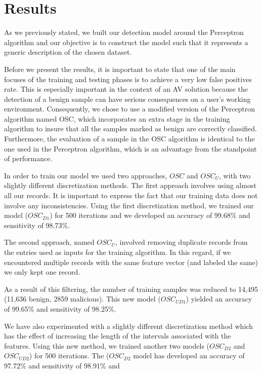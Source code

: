 \section{Results}
\par
As we previously stated, we built our detection model around the Perceptron algorithm and our objective is to construct the model such that it represents a generic description of the chosen dataset.
\par
Before we present the results, it is important to state that one of the main focuses of the training and testing phases is to achieve a very low false positives rate. This is especially important in the context of an AV solution because the detection of a benign sample can have serious consequences on a user's working environment. Consequently, we chose to use a modified version of the Perceptron algorithm named OSC, which incorporates an extra stage in the training algorithm to insure that all the samples marked as benign are correctly classified. Furthermore, the evaluation of a sample in the OSC algorithm is identical to the one used in the Perceptron algorithm, which is an advantage from the standpoint of performance.
\par
In order to train our model we used two approaches, $OSC$ and $OSC_{U}$, with two slightly different discretization methods. The first approach involves using almost all our records. It is important to express the fact that our training data does not involve any inconsistencies. Using the first discretization method, we trained our model ({$OSC_{D1}$}) for 500 iterations and we developed an accuracy of 99.68\% and sensitivity of 98.73\%. 
\par
The second approach, named $OSC_{U}$,  involved removing duplicate records from the entries used as inputs for the training algorithm. In this regard, if we encountered multiple records with the same feature vector (and labeled the same) we only kept one record.
\par
As a result of this filtering, the number of training samples was reduced to 14,495 (11,636 benign, 2859 malicious). This new model ({$OSC_{UD1}$}) yielded an accuracy of 99.65\% and sensitivity of 98.25\%.
\par
We have also experimented with a slightly different discretization method which has the effect of increasing the length of the intervals associated with the features. Using this new method, we trained another two models ({$OSC_{D2}$} and {$OSC_{UD2}$}) for 500 iterations. The ({$OSC_{D2}$} model has developed an accuracy of 97.72\% and sensitivity of 98.91\% and
